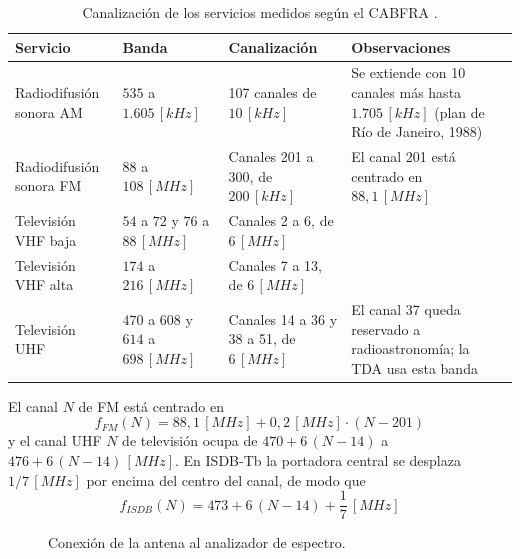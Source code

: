 \begin{table}[H]
    \centering
    \caption{Canalización de los servicios medidos según el CABFRA \cite{cabfra}.}
    \label{tab:canalizacion}
    \begin{tabular}{p{3.6cm} p{3.4cm} p{3.0cm} p{4.4cm}}
        \toprule
        \textbf{Servicio} & \textbf{Banda} & \textbf{Canalización} & \textbf{Observaciones} \\
        \midrule
        Radiodifusión sonora AM & $535$ a $1.605 \, [kHz]$ & 107 canales de $10 \, [kHz]$ & Se extiende con 10 canales más hasta $1.705 \, [kHz]$ (plan de Río de Janeiro, 1988) \\
        Radiodifusión sonora FM & $88$ a $108 \, [MHz]$ & Canales 201 a 300, de $200 \, [kHz]$ & El canal 201 está centrado en $88{,}1 \, [MHz]$ \\
        Televisión VHF baja & $54$ a $72$ y $76$ a $88 \, [MHz]$ & Canales 2 a 6, de $6 \, [MHz]$ & \\
        Televisión VHF alta & $174$ a $216 \, [MHz]$ & Canales 7 a 13, de $6 \, [MHz]$ & \\
        Televisión UHF & $470$ a $608$ y $614$ a $698 \, [MHz]$ & Canales 14 a 36 y 38 a 51, de $6 \, [MHz]$ & El canal 37 queda reservado a radioastronomía; la TDA usa esta banda \\
        \bottomrule
    \end{tabular}
\end{table}

El canal $N$ de FM está centrado en
\begin{equation}
    f_{FM}(N) = 88{,}1 \, [MHz] + 0{,}2 \, [MHz] \cdot (N - 201)
    \label{eq:canal_fm}
\end{equation}
y el canal UHF $N$ de televisión ocupa de $470 + 6\,(N-14)$ a $476 + 6\,(N-14) \, [MHz]$. En ISDB-Tb la portadora central se desplaza $1/7 \, [MHz]$ por encima del centro del canal, de modo que
\begin{equation}
    f_{ISDB}(N) = 473 + 6\,(N - 14) + \frac{1}{7} \, [MHz]
    \label{eq:canal_isdb}
\end{equation}

\begin{figure}[H]
    \centering
    \caption{Conexión de la antena al analizador de espectro.}
    \label{fig:conexion}
\end{figure}


